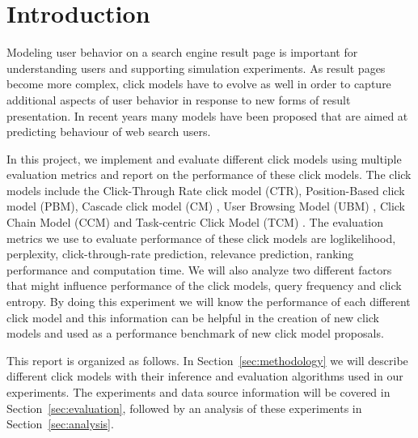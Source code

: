 \section{Introduction}
Modeling user behavior on a search engine result page is important for understanding users and supporting simulation experiments.
As result pages become more complex, click models have to evolve as well in order to capture additional aspects of user behavior in response to new forms of result presentation.
In recent years many models have been proposed that are aimed at predicting behaviour of web search users. 

In this project, we implement and evaluate different click models using multiple evaluation metrics and report on the performance of these click models.
The click models include the Click-Through Rate click model (CTR), Position-Based click model (PBM), Cascade click model (CM) \cite{Kempe2008}, User Browsing Model (UBM) \cite{Dupret2008}, Click Chain Model (CCM) \cite{Guo2009_CCM} and Task-centric Click Model (TCM) \cite{Zhang2011}.
The evaluation metrics we use to evaluate performance of these click models are loglikelihood, perplexity, click-through-rate prediction, relevance prediction, ranking performance and computation time. We will also analyze two different factors that might influence performance of the click models, query frequency and click entropy.
By doing this experiment we will know the performance of each different click model and this information can be helpful in the creation of new click models and used as a performance benchmark of new click model proposals.

This report is organized as follows.
In Section~\ref{sec:methodology} we will describe different click models with their inference and evaluation algorithms used in our experiments.
The experiments and data source information will be covered in Section~\ref{sec:evaluation}, followed by an analysis of these experiments in Section~\ref{sec:analysis}.
